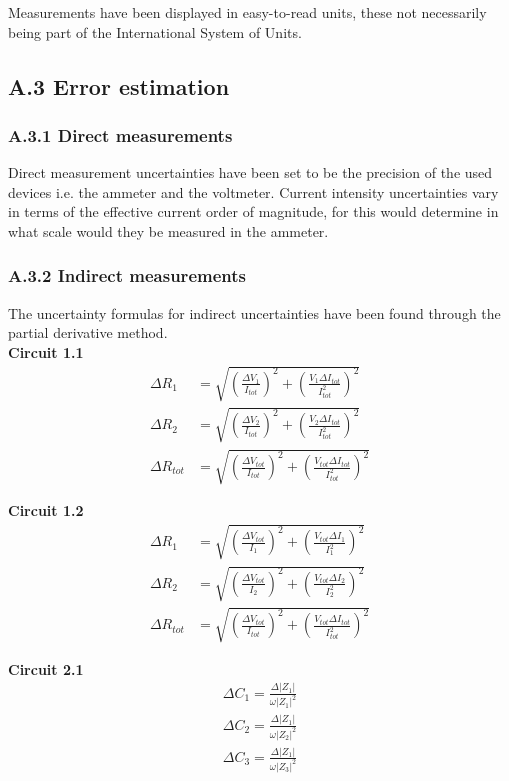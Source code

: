 \documentclass[a4paper, 12pt]{article}
\begin{document}
Measurements have been displayed in easy-to-read units, these not necessarily being part of the International System of Units.
\subsection{A.3 Error estimation}
\subsubsection{A.3.1 Direct measurements}
Direct measurement uncertainties have been set to be the precision of the used devices i.e. the ammeter and the voltmeter. Current intensity uncertainties vary in terms of the effective current order of magnitude, for this would determine in what scale would they be measured in the ammeter.
\subsubsection{A.3.2 Indirect measurements}
The uncertainty formulas for indirect uncertainties have been found through the partial derivative method.\\

\textbf{Circuit 1.1}
\begin{align}
	\Delta R_1 &= \sqrt{\left(\frac{\Delta V_1}{I_{tot}}\right)^2 + \left(\frac{V_1\Delta I_{tot}}{I_{tot}^2}\right)^2} \\
	\Delta R_2 &= \sqrt{\left(\frac{\Delta V_2}{I_{tot}}\right)^2 + \left(\frac{V_2\Delta I_{tot}}{I_{tot}^2}\right)^2} \\
	\Delta R_{tot} &= \sqrt{\left(\frac{\Delta V_{tot}}{I_{tot}}\right)^2 + \left(\frac{V_{tot}\Delta I_{tot}}{I_{tot}^2}\right)^2} 
\end{align}

\textbf{Circuit 1.2}
\begin{align}
	\Delta R_1 &= \sqrt{\left(\frac{\Delta V_{tot}}{I_{1}}\right)^2 + \left(\frac{V_{tot}\Delta I_{1}}{I_{1}^2}\right)^2} \\
	\Delta R_2 &= \sqrt{\left(\frac{\Delta V_{tot}}{I_{2}}\right)^2 + \left(\frac{V_{tot}\Delta I_{2}}{I_{2}^2}\right)^2} \\
	\Delta R_{tot} &= \sqrt{\left(\frac{\Delta V_{tot}}{I_{tot}}\right)^2 + \left(\frac{V_{tot}\Delta I_{tot}}{I_{tot}^2}\right)^2} 
\end{align}

\textbf{Circuit 2.1}
\begin{align}
	\Delta C_1 = \frac{\Delta |Z_1|}{\omega |Z_1|^2}\\
	\Delta C_2 = \frac{\Delta |Z_1|}{\omega |Z_2|^2}\\
	\Delta C_3 = \frac{\Delta |Z_1|}{\omega |Z_3|^2}
\end{align}\\
\end{document}

